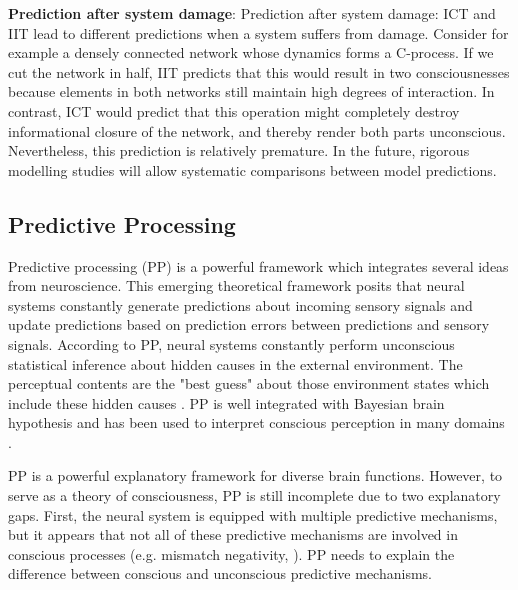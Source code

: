 \documentclass[utf8]{article}
\begin{document}
		    \textbf{Prediction after system damage}: Prediction after system damage: ICT and IIT lead to different predictions when a system suffers from damage. Consider for example a densely connected network whose dynamics forms a C-process. If we cut the network in half, IIT predicts that this would result in two consciousnesses because elements in both networks still maintain high degrees of interaction. In contrast, ICT would predict that this operation might completely destroy informational closure of the network, and thereby render both parts unconscious. Nevertheless, this prediction is relatively premature. In the future, rigorous modelling studies will allow systematic comparisons between model predictions.
	    

		\subsection{Predictive Processing}
    		Predictive processing (PP) is a powerful framework which integrates several ideas from neuroscience. This emerging theoretical framework posits that neural systems constantly generate predictions about incoming sensory signals and update predictions based on prediction errors between predictions and sensory signals. According to PP, neural systems constantly perform unconscious statistical inference about hidden causes in the external environment. The perceptual contents are the "best guess" about those environment states which include these hidden causes \citep{clark_2013, Hohwy2013}. PP is well integrated with Bayesian brain hypothesis and has been used to interpret conscious perception in many domains \citep{Hohwy2013, seth2014predictive}.
    		
    		PP is a powerful explanatory framework for diverse brain functions. However, to serve as a theory of consciousness, PP is still incomplete due to two explanatory gaps. First, the neural system is equipped with multiple predictive mechanisms, but it appears that not all of these predictive mechanisms are involved in conscious processes (e.g. mismatch negativity, \cite{naatanen2007mismatch}). PP needs to explain the difference between conscious and unconscious predictive mechanisms. 
    		
\end{document}
